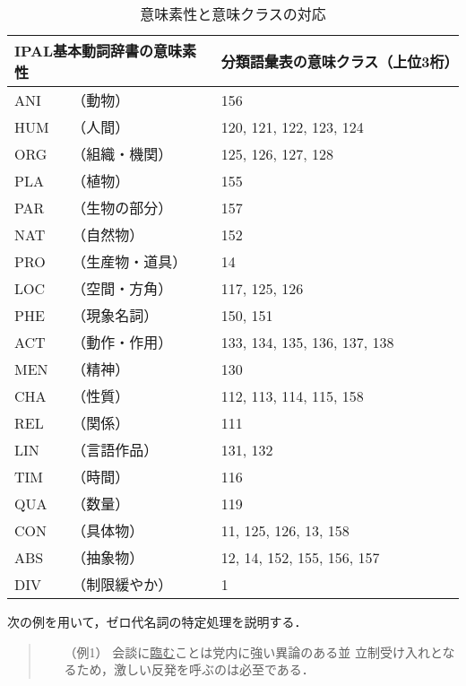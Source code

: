 \begin{table}[htbp]
\def\baselinestretch{}
\begin{center}
\caption{意味素性と意味クラスの対応}
\label{tab:taiou}
\smallskip \footnotesize
\begin{tabular}{l@{}ll} \hline\hline
\multicolumn{2}{l}{IPAL基本動詞辞書の意味素性} & \multicolumn{1}{l}{分類語彙表の意味クラス（上位3桁）} \\\hline
ANI & （動物） & 156 \\
HUM & （人間） & 120, 121, 122, 123, 124 \\
ORG & （組織・機関） & 125, 126, 127, 128 \\
PLA & （植物） & 155 \\
PAR & （生物の部分） & 157 \\
NAT & （自然物） & 152 \\
PRO & （生産物・道具） & 14\\
LOC & （空間・方角） & 117, 125, 126 \\
PHE & （現象名詞） & 150, 151 \\
ACT & （動作・作用） & 133, 134, 135, 136, 137, 138 \\
MEN & （精神） & 130 \\
CHA & （性質） & 112, 113, 114, 115, 158 \\
REL & （関係） & 111 \\
LIN & （言語作品） & 131, 132 \\
TIM & （時間） & 116 \\
QUA & （数量） & 119 \\
CON & （具体物） & 11, 125, 126, 13, 158 \\
ABS & （抽象物） & 12, 14, 152, 155, 156, 157 \\
DIV & （制限緩やか） & 1 \\
\hline
\end{tabular}
\end{center}
\end{table}

次の例を用いて，ゼロ代名詞の特定処理を説明する．

\begin{flushleft}
  \begin{quote}
    \begin{itemize}
    \item [（例1）]会談に\underline{臨む}ことは党内に強い異論のある並
      立制受け入れとなるため，激しい反発を呼ぶのは必至である．
    \end{itemize}
  \end{quote}
\end{flushleft}

